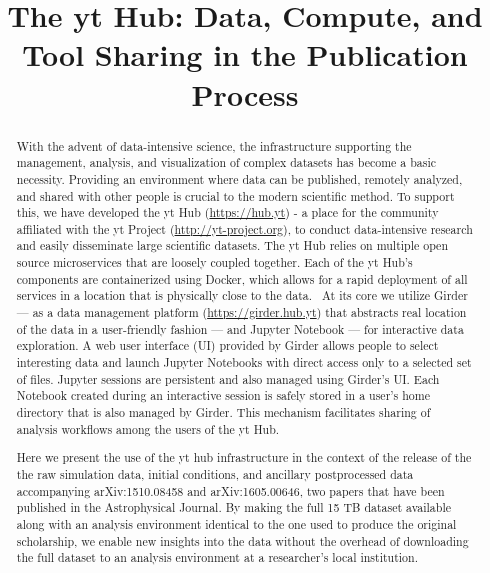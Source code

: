 \documentclass[conference]{IEEEtran}
\begin{document}
\title{The yt Hub: Data, Compute, and Tool Sharing in the Publication Process}

\author{
}
\maketitle
\begin{abstract}
With the advent of data-intensive science, the infrastructure supporting the
   management, analysis, and visualization of complex datasets has become a
   basic necessity. Providing an environment where data can be published,
   remotely analyzed, and shared with other people is crucial to the modern
   scientific method. To support this, we have developed the yt Hub
   (\url{https://hub.yt}) - a place for the community affiliated with the yt
   Project (\url{http://yt-project.org}), to conduct data-intensive research and
   easily disseminate large scientific datasets. The yt Hub relies on multiple
   open source microservices that are loosely coupled together. Each of the yt
   Hub's components are containerized using Docker, which allows for a rapid
   deployment of all services in a location that is physically close to the
   data.  At its core we utilize Girder --- as a data management platform
   (\url{https://girder.hub.yt}) that abstracts real location of the data in a
   user-friendly fashion --- and Jupyter Notebook --- for interactive data
   exploration. A web user interface (UI) provided by Girder allows people to
   select interesting data and launch Jupyter Notebooks with direct access only
   to a selected set of files. Jupyter sessions are persistent and also managed
   using Girder's UI. Each Notebook created during an interactive session is
   safely stored in a user's home directory that is also managed by Girder. This
   mechanism facilitates sharing of analysis workflows among the users of the yt
   Hub.
   
\par Here we present the use of the yt hub infrastructure in the context of the
   release of the the raw simulation data, initial conditions, and ancillary
   postprocessed data accompanying arXiv:1510.08458 and arXiv:1605.00646, two
   papers that have been published in the Astrophysical Journal. By making the
   full 15 TB dataset available along with an analysis environment identical to
   the one used to produce the original scholarship, we enable new insights into
   the data without the overhead of downloading the full dataset to an analysis
   environment at a researcher's local institution.

\end{abstract}
\end{document}
